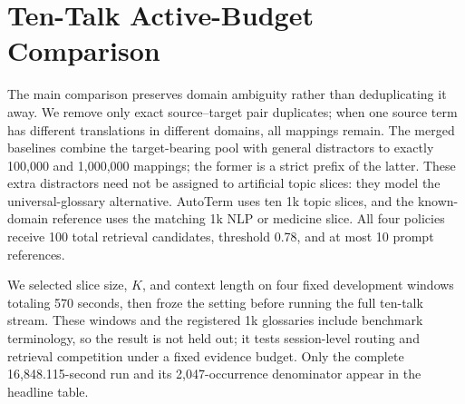 \section{Ten-Talk Active-Budget Comparison}
\label{app:mixed}

\begin{table}[ht]
\centering
\scriptsize
{}
\caption{Domain breakdown and prompt evidence for the full stream. Hits and
TERM\_ACC use 2,047 spoken occurrences (1,368 NLP, 679 medicine).}
\label{tab:mixed}
\end{table}

The main comparison preserves domain ambiguity rather than deduplicating it
away. We remove only exact source--target pair duplicates; when one source term
has different translations in different domains, all mappings remain. The
merged baselines combine the target-bearing pool with general distractors to
exactly 100,000 and 1,000,000 mappings; the former is a strict prefix of the
latter. These extra distractors need not be assigned to
artificial topic slices: they model the universal-glossary alternative. AutoTerm
uses ten 1k topic slices, and the known-domain reference uses the matching 1k NLP or medicine
slice. All four policies receive 100 total retrieval candidates, threshold
0.78, and at most 10 prompt references.

We selected slice size, $K$, and context length on four fixed development
windows totaling 570 seconds, then froze the setting before running the full
ten-talk stream. These windows and the registered 1k glossaries include
benchmark terminology, so the result is not held out; it tests session-level
routing and retrieval competition under a fixed evidence budget. Only the
complete 16,848.115-second run and its 2,047-occurrence denominator appear in
the headline table.
